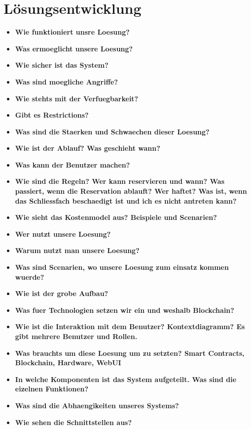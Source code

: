 \chapter{Lösungsentwicklung}
\label{cha:Lösungsentwicklung}
\begin{itemize}
    \item \textbf{ Wie funktioniert unsre Loesung? }
    \item \textbf{ Was ermoeglicht unsere Loesung? }
    \item \textbf{ Wie sicher ist das System? }
    \item \textbf{ Was sind moegliche Angriffe? }
    \item \textbf{ Wie stehts mit der Verfuegbarkeit?}
    \item \textbf{ Gibt es Restrictions?}
    \item \textbf{ Was sind die Staerken und Schwaechen dieser Loesung? }
    \item \textbf{ Wie ist der Ablauf? Was geschieht wann?}
    \item \textbf{ Was kann der Benutzer machen?}
    \item \textbf{ Wie sind die Regeln? Wer kann reservieren und wann? Was passiert, wenn die Reservation ablauft? Wer haftet? Was ist, wenn das Schliessfach beschaedigt ist und ich es nicht antreten kann?}
    \item \textbf{ Wie sieht das Kostenmodel aus? Beispiele und Scenarien?}
    \item \textbf{ Wer nutzt unsere Loesung? }
    \item \textbf{ Warum nutzt man unsere Loesung?}
    \item \textbf{ Was sind Scenarien, wo unsere Loesung zum einsatz kommen wuerde?}
    \item \textbf{ Wie ist der grobe Aufbau?}
    \item \textbf{ Was fuer Technologien setzen wir ein und weshalb Blockchain?}
    \item \textbf{ Wie ist die Interaktion mit dem Benutzer? Kontextdiagramm? Es gibt mehrere Benutzer und Rollen.}
    \item \textbf{ Was brauchts um diese Loesung um zu setzten? Smart Contracts, Blockchain, Hardware, WebUI }
    \item \textbf{ In welche Komponenten ist das System aufgeteilt. Was sind die eizelnen Funktionen?}
    \item \textbf{ Was sind die Abhaengikeiten unseres Systems?}
    \item \textbf{ Wie sehen die Schnittstellen aus?} 

\end{itemize}

